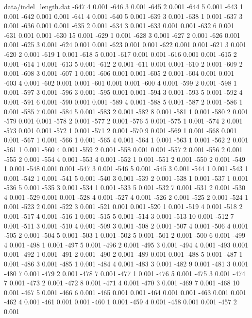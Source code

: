 \begin{filecontents}{data/indel_length.dat}
-647	4	0.001
-646	3	0.001
-645	2	0.001
-644	5	0.001
-643	1	0.001
-642	0.001	0.001
-641	4	0.001
-640	5	0.001
-639	3	0.001
-638	1	0.001
-637	3	0.001
-636	0.001	0.001
-635	2	0.001
-634	3	0.001
-633	0.001	0.001
-632	6	0.001
-631	0.001	0.001
-630	15	0.001
-629	1	0.001
-628	3	0.001
-627	2	0.001
-626	0.001	0.001
-625	3	0.001
-624	0.001	0.001
-623	0.001	0.001
-622	0.001	0.001
-621	3	0.001
-620	2	0.001
-619	1	0.001
-618	5	0.001
-617	0.001	0.001
-616	0.001	0.001
-615	2	0.001
-614	1	0.001
-613	5	0.001
-612	2	0.001
-611	0.001	0.001
-610	2	0.001
-609	2	0.001
-608	3	0.001
-607	1	0.001
-606	0.001	0.001
-605	2	0.001
-604	0.001	0.001
-603	4	0.001
-602	0.001	0.001
-601	0.001	0.001
-600	4	0.001
-599	2	0.001
-598	1	0.001
-597	3	0.001
-596	3	0.001
-595	0.001	0.001
-594	3	0.001
-593	5	0.001
-592	4	0.001
-591	6	0.001
-590	0.001	0.001
-589	4	0.001
-588	5	0.001
-587	2	0.001
-586	1	0.001
-585	7	0.001
-584	5	0.001
-583	2	0.001
-582	8	0.001
-581	1	0.001
-580	2	0.001
-579	0.001	0.001
-578	2	0.001
-577	2	0.001
-576	5	0.001
-575	1	0.001
-574	2	0.001
-573	0.001	0.001
-572	1	0.001
-571	2	0.001
-570	9	0.001
-569	1	0.001
-568	0.001	0.001
-567	1	0.001
-566	1	0.001
-565	4	0.001
-564	1	0.001
-563	1	0.001
-562	2	0.001
-561	1	0.001
-560	4	0.001
-559	2	0.001
-558	0.001	0.001
-557	2	0.001
-556	2	0.001
-555	2	0.001
-554	4	0.001
-553	4	0.001
-552	1	0.001
-551	2	0.001
-550	2	0.001
-549	1	0.001
-548	0.001	0.001
-547	3	0.001
-546	5	0.001
-545	3	0.001
-544	1	0.001
-543	1	0.001
-542	1	0.001
-541	5	0.001
-540	3	0.001
-539	2	0.001
-538	1	0.001
-537	1	0.001
-536	5	0.001
-535	3	0.001
-534	1	0.001
-533	5	0.001
-532	7	0.001
-531	2	0.001
-530	4	0.001
-529	0.001	0.001
-528	4	0.001
-527	4	0.001
-526	2	0.001
-525	2	0.001
-524	1	0.001
-523	2	0.001
-522	3	0.001
-521	0.001	0.001
-520	1	0.001
-519	4	0.001
-518	2	0.001
-517	4	0.001
-516	1	0.001
-515	5	0.001
-514	3	0.001
-513	10	0.001
-512	7	0.001
-511	3	0.001
-510	4	0.001
-509	3	0.001
-508	2	0.001
-507	4	0.001
-506	4	0.001
-505	2	0.001
-504	5	0.001
-503	1	0.001
-502	5	0.001
-501	2	0.001
-500	6	0.001
-499	4	0.001
-498	1	0.001
-497	5	0.001
-496	2	0.001
-495	3	0.001
-494	4	0.001
-493	0.001	0.001
-492	1	0.001
-491	2	0.001
-490	2	0.001
-489	0.001	0.001
-488	5	0.001
-487	1	0.001
-486	3	0.001
-485	1	0.001
-484	4	0.001
-483	3	0.001
-482	9	0.001
-481	3	0.001
-480	7	0.001
-479	2	0.001
-478	7	0.001
-477	1	0.001
-476	5	0.001
-475	3	0.001
-474	7	0.001
-473	2	0.001
-472	8	0.001
-471	4	0.001
-470	3	0.001
-469	7	0.001
-468	10	0.001
-467	5	0.001
-466	6	0.001
-465	0.001	0.001
-464	0.001	0.001
-463	0.001	0.001
-462	4	0.001
-461	0.001	0.001
-460	1	0.001
-459	4	0.001
-458	0.001	0.001
-457	2	0.001

\end{filecontents}
